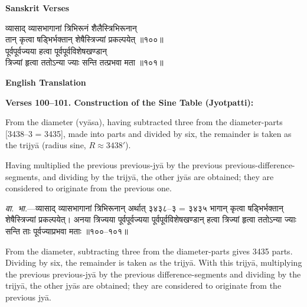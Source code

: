 \documentclass[11pt,a4paper]{article}
\begin{document}
\begin{minipage}[t]{0.48\textwidth}
\textbf{\small Sanskrit Verses}

\small\devanagarifont
व्यासाद् व्यासभागानां त्रिभिरूनं शैलैस्त्रिभिरूनान्\\
तान् कृत्वा षड्भिर्भक्तान् शेषैस्त्रिज्यां प्रकल्पयेत् ॥१००॥\\[0.5em]
पूर्वपूर्वज्यया हत्वा पूर्वपूर्वविशेषखण्डान्\\
त्रिज्यां हृत्वा ततोऽन्या ज्याः सन्ति तत्प्रभवा मता ॥१०१॥
\end{minipage}%
\hfill
\begin{minipage}[t]{0.48\textwidth}
\textbf{\small English Translation}

\textbf{Verses 100--101. Construction of the Sine Table (Jyotpatti):}

From the diameter (vy\=asa), having subtracted three from the diameter-parts [3438--3 = 3435], made into parts and divided by six, the remainder is taken as the trijy\=a (radius sine, $R \approx 3438'$).

Having multiplied the previous previous-jy\=a by the previous previous-difference-segments, and dividing by the trijy\=a, the other jy\=as are obtained; they are considered to originate from the previous one.
\end{minipage}

\vspace{0.5em}
\begin{minipage}[t]{0.48\textwidth}
\small\devanagarifont
\textit{वा.~भा.}---व्यासाद् व्यासभागानां त्रिभिरूनान् अर्थात् ३४३८--३ = ३४३५ भागान् कृत्वा षड्भिर्भक्तान् शेषैस्त्रिज्यां प्रकल्पयेत्। अनया त्रिज्यया पूर्वपूर्वज्यया पूर्वपूर्वविशेषखण्डान् हत्वा त्रिज्यां हृत्वा ततोऽन्या ज्याः सन्ति ताः पूर्वज्याप्रभवा मताः ॥१००--१०१॥
\end{minipage}%
\hfill
\begin{minipage}[t]{0.48\textwidth}
\small
From the diameter, subtracting three from the diameter-parts gives 3435 parts. Dividing by six, the remainder is taken as the trijy\=a. With this trijy\=a, multiplying the previous previous-jy\=a by the previous difference-segments and dividing by the trijy\=a, the other jy\=as are obtained; they are considered to originate from the previous jy\=a.
\end{minipage}
\end{document}
